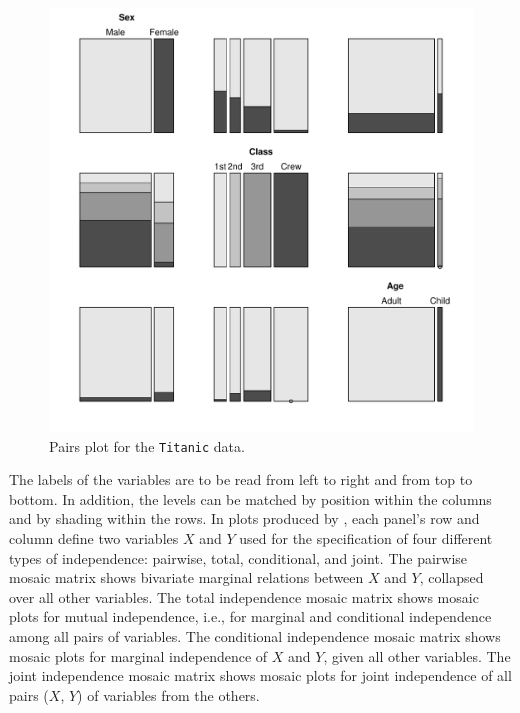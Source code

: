 \documentclass{Z}
\newcommand{\data}[1]{\texttt{#1}}
\newcommand{\codefun}[1]{\code{#1()}}
\begin{document}
\begin{figure}[h]
\begin{center}
\includegraphics{strucplot-pairsfig}
\caption{Pairs plot for the \data{Titanic} data.}
\label{fig:pairs}
\end{center}
\end{figure}

\noindent The labels of the variables are to be read from left to
right and from top to bottom. In addition, the levels can be matched
by position within the columns and by shading within the rows.
In plots produced by \codefun{pairs}, 
each panel's row and column define two variables $X$ and $Y$ used for the
specification of four different types of independence: pairwise,
total, conditional, and joint. The pairwise mosaic
matrix shows bivariate marginal relations between $X$ and $Y$, collapsed over all
other variables. The total independence mosaic matrix shows mosaic
plots for mutual independence, i.e., for marginal and conditional independence
among all pairs of variables. The conditional
independence mosaic matrix shows mosaic plots for marginal
independence of $X$ and $Y$, given all other variables. The joint independence
mosaic matrix shows mosaic plots for joint independence of all
pairs ($X$, $Y$) of variables from the others.
\end{document}
